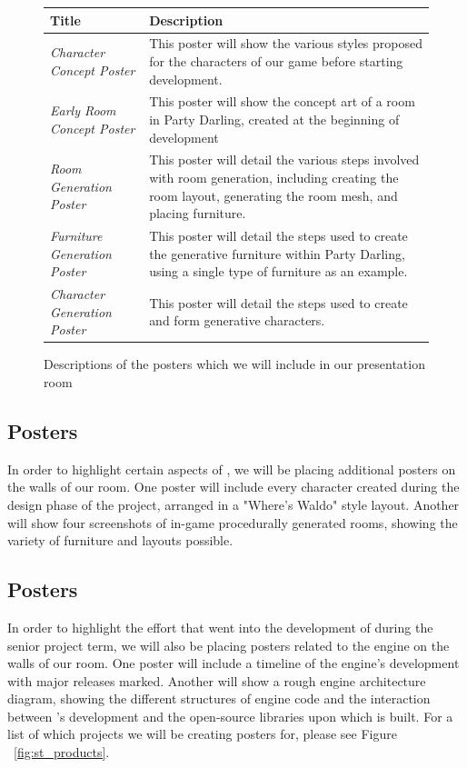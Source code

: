 \documentclass{GlobalDocument}
\begin{document}
\begin{figure}[htb]
	\centering
	\begin{tabular}{ | p{7cm} | p{7cm} |}
		\hline
		Title & Description \\ \hline
		
		\textit{Character Concept Poster}&
		This poster will show the various styles proposed for the characters of our game before starting development.\\ \hline
		
		\textit{Early Room Concept Poster}&
		This poster will show the concept art of a room in Party Darling, created at the beginning of development\\ \hline
		
		\textit{Room Generation Poster}&
		This poster will detail the various steps involved with room generation, including creating the room layout, generating the room mesh, and placing furniture.\\ \hline
		
		\textit{Furniture Generation Poster} &
		This poster will detail the steps used to create the generative furniture within Party Darling, using a single type of furniture as an example.\\ \hline
		
		\textit{Character Generation Poster} &		
		This poster will detail the steps used to create and form generative characters.\\ \hline
		
	\end{tabular}
	\caption{Descriptions of the posters which we will include in our presentation room}
	\label{table:products}
\end{figure}

\subsection{\ourgame{} Posters}
In order to highlight certain aspects of \ourgame{}, we will be placing additional posters on the walls of our room. One poster will include every character created during the design phase of the project, arranged in a "Where's Waldo" style layout. Another will show four screenshots of in-game procedurally generated rooms, showing the variety of furniture and layouts possible.

\subsection{\ourengine{} Posters}
In order to highlight the effort that went into the development of \ourengine{} during the senior project term, we will also be placing posters related to the engine on the walls of our room. One poster will include a timeline of the engine's development with major releases marked. Another will show a rough engine architecture diagram, showing the different structures of engine code and the interaction between \ourteam{}'s development and the open-source libraries upon which \ourengine{} is built. For a list of which projects we will be creating posters for, please see Figure ~\ref{fig:st_products}.
\end{document}
